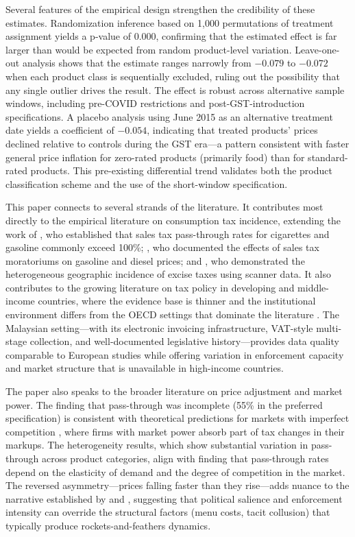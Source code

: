 \documentclass[12pt]{article}
\begin{document}
Several features of the empirical design strengthen the credibility of these estimates. Randomization inference based on 1,000 permutations of treatment assignment yields a p-value of 0.000, confirming that the estimated effect is far larger than would be expected from random product-level variation. Leave-one-out analysis shows that the estimate ranges narrowly from $-0.079$ to $-0.072$ when each product class is sequentially excluded, ruling out the possibility that any single outlier drives the result. The effect is robust across alternative sample windows, including pre-COVID restrictions and post-GST-introduction specifications. A placebo analysis using June 2015 as an alternative treatment date yields a coefficient of $-0.054$, indicating that treated products' prices declined relative to controls during the GST era---a pattern consistent with faster general price inflation for zero-rated products (primarily food) than for standard-rated products. This pre-existing differential trend validates both the product classification scheme and the use of the short-window specification.

This paper connects to several strands of the literature. It contributes most directly to the empirical literature on consumption tax incidence, extending the work of \citet{besley1999}, who established that sales tax pass-through rates for cigarettes and gasoline commonly exceed 100\%; \citet{doyle2008}, who documented the effects of sales tax moratoriums on gasoline and diesel prices; and \citet{harding2012}, who demonstrated the heterogeneous geographic incidence of excise taxes using scanner data. It also contributes to the growing literature on tax policy in developing and middle-income countries, where the evidence base is thinner and the institutional environment differs from the OECD settings that dominate the literature \citep{cnossen2015, keen2008}. The Malaysian setting---with its electronic invoicing infrastructure, VAT-style multi-stage collection, and well-documented legislative history---provides data quality comparable to European studies while offering variation in enforcement capacity and market structure that is unavailable in high-income countries.

The paper also speaks to the broader literature on price adjustment and market power. The finding that pass-through was incomplete (55\% in the preferred specification) is consistent with theoretical predictions for markets with imperfect competition \citep{weyl2013}, where firms with market power absorb part of tax changes in their markups. The heterogeneity results, which show substantial variation in pass-through across product categories, align with \citet{ganapati2020} finding that pass-through rates depend on the elasticity of demand and the degree of competition in the market. The reversed asymmetry---prices falling faster than they rise---adds nuance to the narrative established by \citet{peltzman2000} and \citet{tappata2009}, suggesting that political salience and enforcement intensity can override the structural factors (menu costs, tacit collusion) that typically produce rockets-and-feathers dynamics.
\end{document}
